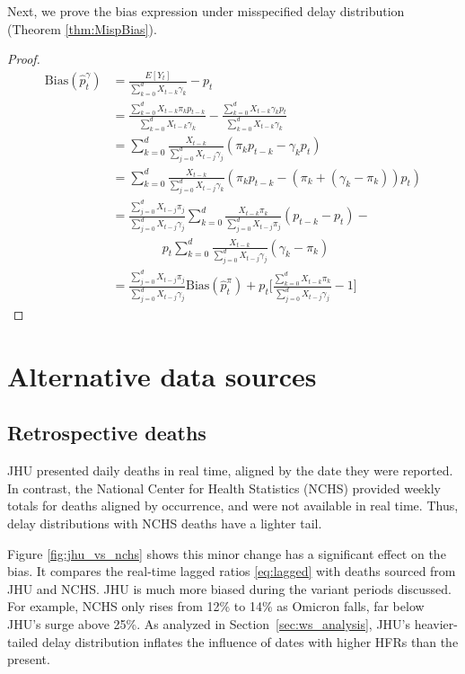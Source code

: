 \documentclass{article}
\begin{document}
Next, we prove the bias expression under misspecified delay distribution (Theorem \ref{thm:MispBias}). 
\begin{proof}
    \begin{align*}
    \text{Bias}(\hat{p}_t^\gamma) &= \frac{E[Y_t]}{\sum_{k=0}^d X_{t-k}\gamma_k} - p_t \\
    &= \frac{\sum_{k=0}^d X_{t-k}\pi_k p_{t-k}}{\sum_{k=0}^d X_{t-k}\gamma_k} - \frac{\sum_{k=0}^d X_{t-k}\gamma_k p_t}{\sum_{k=0}^d X_{t-k}\gamma_k} \\
    &= \sum_{k=0}^d \frac{X_{t-k}}{\sum_{j=0}^d X_{t-j}\gamma_j}(\pi_k p_{t-k}-\gamma_k p_t) \\
    &= \sum_{k=0}^d \frac{X_{t-k}}{\sum_{j=0}^d X_{t-j}\gamma_k}(\pi_k p_{t-k}-(\pi_k +(\gamma_k-\pi_k)) p_t) \\
     &= \frac{\sum_{j=0}^d X_{t-j}\pi_j}{\sum_{j=0}^d X_{t-j}\gamma_j}\sum_{k=0}^d \frac{X_{t-k}\pi_k}{\sum_{j=0}^d X_{t-j}\pi_j}(p_{t-k}-p_t) -\\
     &\qquad\qquad p_t\sum_{k=0}^d \frac{X_{t-k}}{\sum_{j=0}^d X_{t-j}\gamma_j}(\gamma_k -\pi_k)  \\
     &= \frac{\sum_{j=0}^d X_{t-j}\pi_j}{\sum_{j=0}^d X_{t-j}\gamma_j}\text{Bias}(\hat{p}_t^\pi) + p_t\Big[ \frac{\sum_{k=0}^d X_{t-k}\pi_k}{\sum_{j=0}^d X_{t-j}\gamma_j}-1\Big]
\end{align*}
\end{proof}


\section{Alternative data sources}
\subsection{Retrospective deaths}\label{apx:NCHS_deaths}

JHU presented daily deaths in real time, aligned by the date they were reported. In contrast, the National Center for Health Statistics (NCHS) provided weekly totals for deaths aligned by occurrence, and were not available in real time. Thus, delay distributions with NCHS deaths have a lighter tail. 

Figure \ref{fig:jhu_vs_nchs} shows this minor change has a significant effect on the bias. It compares the real-time lagged ratios \eqref{eq:lagged} with deaths sourced from JHU and NCHS. JHU is much more biased during the variant periods discussed. For example, NCHS only rises from 12\% to 14\% as Omicron falls, far below JHU's surge above 25\%. As analyzed in Section~\ref{sec:ws_analysis}, JHU's heavier-tailed delay distribution inflates the influence of dates with higher HFRs than the present.
\end{document}
